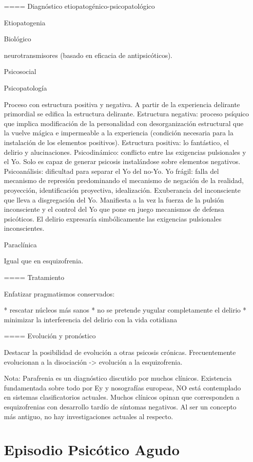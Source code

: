 \documentclass{scrbook}
\begin{document}
==== Diagnóstico etiopatogénico-psicopatológico

Etiopatogenia

Biológico

neurotransmisores (basado en eficacia de antipsicóticos).

Psicosocial

Psicopatología

Proceso con estructura positiva y negativa. A partir de la experiencia delirante primordial se edifica la estructura delirante. Estructura negativa: proceso psíquico que implica modificación de la personalidad con desorganización estructural que la vuelve mágica e impermeable a la experiencia (condición necesaria para la instalación de los elementos positivos). Estructura positiva: lo fantástico, el delirio y alucinaciones. Psicodinámico: conflicto entre las exigencias pulsionales y el Yo. Solo es capaz de generar psicosis instalándose sobre elementos negativos. Psicoanálisis: dificultad para separar el Yo del no-Yo. Yo frágil: falla del mecanismo de represión predominando el mecanismo de negación de la realidad, proyección, identificación proyectiva, idealización. Exuberancia del inconsciente que lleva a disgregación del Yo. Manifiesta a la vez la fuerza de la pulsión inconsciente y el control del Yo que pone en juego mecanismos de defensa psicóticos. El delirio expresaría simbólicamente las exigencias pulsionales inconscientes.

Paraclínica

Igual que en esquizofrenia.

==== Tratamiento

Enfatizar pragmatismos conservados:

* rescatar núcleos más sanos
* no se pretende yugular completamente el delirio
* minimizar la interferencia del delirio con la vida cotidiana

==== Evolución y pronóstico

Destacar la posibilidad de evolución a otras psicosis crónicas. Frecuentemente evolucionan a la disociación -> evolución a la esquizofrenia.

Nota: Parafrenia es un diagnóstico discutido por muchos clínicos. Existencia fundamentada sobre todo por Ey y nosografías europeas, NO está contemplado en sistemas clasificatorios actuales. Muchos clínicos opinan que corresponden a esquizofrenias con desarrollo tardío de síntomas negativos. Al ser un concepto más antiguo, no hay investigaciones actuales al respecto.
\chapter{Episodio Psicótico Agudo}
\end{document}
